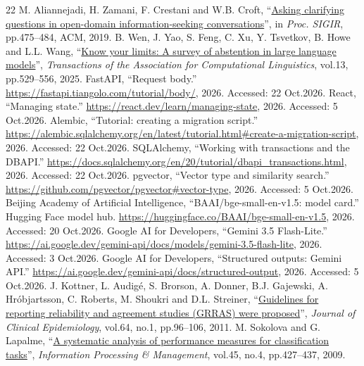 \begin{thebibliography}{22}
 M. Aliannejadi, H. Zamani, F. Crestani and W.B. Croft, ``\href{https://doi.org/10.1145/3331184.3331265}{Asking clarifying questions in open-domain information-seeking conversations}'', in \emph{Proc. SIGIR}, pp.475--484, ACM, 2019.
 B. Wen, J. Yao, S. Feng, C. Xu, Y. Tsvetkov, B. Howe and L.L. Wang, ``\href{https://aclanthology.org/2025.tacl-1.26/}{Know your limits: A survey of abstention in large language models}'', \emph{Transactions of the Association for Computational Linguistics}, vol.13, pp.529--556, 2025.
 FastAPI, ``Request body.'' \url{https://fastapi.tiangolo.com/tutorial/body/}, 2026. Accessed: 22 Oct.2026.
 React, ``Managing state.'' \url{https://react.dev/learn/managing-state}, 2026. Accessed: 5 Oct.2026.
 Alembic, ``Tutorial: creating a migration script.'' \url{https://alembic.sqlalchemy.org/en/latest/tutorial.html\#create-a-migration-script}, 2026. Accessed: 22 Oct.2026.
 SQLAlchemy, ``Working with transactions and the DBAPI.'' \url{https://docs.sqlalchemy.org/en/20/tutorial/dbapi_transactions.html}, 2026. Accessed: 22 Oct.2026.
 pgvector, ``Vector type and similarity search.'' \url{https://github.com/pgvector/pgvector\#vector-type}, 2026. Accessed: 5 Oct.2026.
 Beijing Academy of Artificial Intelligence, ``BAAI/bge-small-en-v1.5: model card.'' Hugging Face model hub. \url{https://huggingface.co/BAAI/bge-small-en-v1.5}, 2026. Accessed: 20 Oct.2026.
 Google AI for Developers, ``Gemini 3.5 Flash-Lite.'' \url{https://ai.google.dev/gemini-api/docs/models/gemini-3.5-flash-lite}, 2026. Accessed: 3 Oct.2026.
 Google AI for Developers, ``Structured outputs: Gemini API.'' \url{https://ai.google.dev/gemini-api/docs/structured-output}, 2026. Accessed: 5 Oct.2026.
 J. Kottner, L. Audig\'e, S. Brorson, A. Donner, B.J. Gajewski, A. Hr\'objartsson, C. Roberts, M. Shoukri and D.L. Streiner, ``\href{https://doi.org/10.1016/j.jclinepi.2010.03.002}{Guidelines for reporting reliability and agreement studies (GRRAS) were proposed}'', \emph{Journal of Clinical Epidemiology}, vol.64, no.1, pp.96--106, 2011.
 M. Sokolova and G. Lapalme, ``\href{https://doi.org/10.1016/j.ipm.2009.03.002}{A systematic analysis of performance measures for classification tasks}'', \emph{Information Processing \& Management}, vol.45, no.4, pp.427--437, 2009.
\end{thebibliography}

